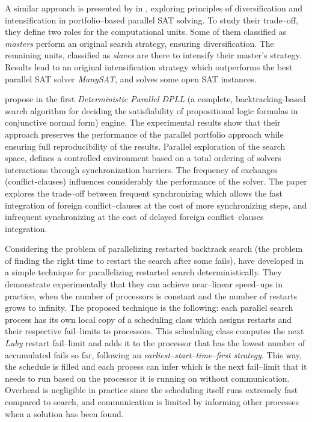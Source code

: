A similar approach is presented by  in \cite{Guo2010}, exploring principles of diversification and intensification in portfolio--based parallel SAT solving. To study their trade--off, they define two roles for the computational units. Some of them classified as {\it masters} perform an original search strategy, ensuring diversification. The remaining units, classified as {\it slaves} are there to intensify their master's strategy. 
Results lead to an original intensification strategy which outperforms the best parallel SAT solver {\it ManySAT}, and solves some open SAT instances.

 propose in \cite{Hamadi2011} the first {\it Deterministic Parallel DPLL} (a complete, backtracking-based search algorithm for deciding the satisfiability of propositional logic formulas in conjunctive normal form) engine. The experimental results show that their approach preserves the performance of the parallel portfolio approach while ensuring full reproducibility of the results. Parallel exploration of the search space, defines a controlled environment based on a total ordering of solvers interactions through synchronization barriers. The frequency of exchanges (conflict-clauses) influences considerably the performance of the solver. The paper explores the trade--off between frequent synchronizing which allows the fast integration of foreign conflict--clauses at the cost of more synchronizing steps, and infrequent synchronizing at the cost of delayed foreign conflict--clauses integration.

Considering the problem of parallelizing restarted backtrack search (the problem of finding the right time to restart the search after some fails),  have developed in \cite{Cire2011} a simple technique for parallelizing restarted search deterministically. They demonstrate experimentally that they can achieve near--linear speed--ups in practice, when the number of processors is constant and the number of restarts grows to infinity. The proposed technique is the following: each parallel search process has its own local copy of a scheduling class which assigns restarts and their respective fail--limits to processors. This scheduling class computes the next {\it Luby} restart fail--limit and adds it to the processor that has the lowest number of accumulated fails so far, following an {\it earliest--start--time--first strategy}. This way, the schedule is filled and each process can infer which is the next fail--limit that it needs to run based on the processor it is running on without communication. Overhead is negligible in practice since the scheduling itself runs extremely fast compared to \cp{} search, and communication is limited by informing other processes when a solution has been found.